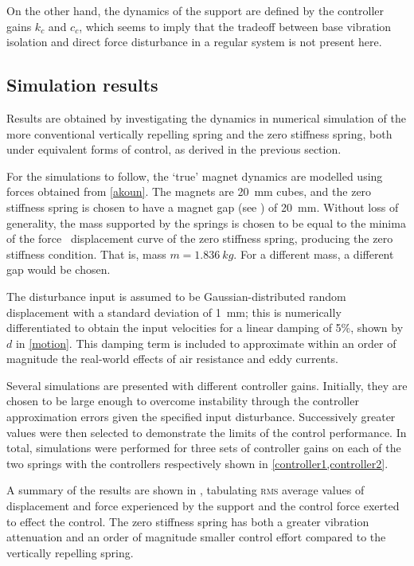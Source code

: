 On the other hand, the dynamics of the support are defined by the
controller gains $k_c$ and $c_c$, which seems to imply that the
tradeoff between base vibration isolation and direct force
disturbance in a regular system is not present here.

\subsection{Simulation results}

Results are obtained by investigating the dynamics in numerical
simulation of the more conventional vertically repelling spring and
the zero stiffness spring, both under equivalent forms of control,
as derived in the previous section.

For the simulations to follow, the `true' magnet dynamics are
modelled using forces obtained from \eqref{akoun}. The magnets are
\SI{20}{mm} cubes, and the zero stiffness spring is chosen to have a
magnet gap (see ) of \SI{20}{mm}. Without loss of
generality, the mass supported by the springs is chosen to be equal
to the minima of the force \vs\  displacement curve of the zero
stiffness spring, producing the zero stiffness condition. That is,
mass $m=\SI{1.836}{kg}$. For a different mass, a different gap
would be chosen.

The disturbance input is assumed to be Gaussian-distributed random
displacement with a standard deviation of \SI{1}{mm}; this is
numerically differentiated to obtain the input velocities for a
linear damping of 5\%, shown by $d$ in \eqref{motion}. This damping
term is included to approximate within an order of magnitude the
real-world effects of air resistance and eddy currents.

Several simulations are presented with different controller gains.
Initially, they are chosen to be large enough to overcome
instability through the controller approximation errors given the
specified input disturbance. Successively greater values were then
selected to demonstrate the limits of the control performance. In
total, simulations were performed for three sets of controller gains
on each of the two springs with the controllers respectively shown
in \eqref{controller1,controller2}.

A summary of the results are shown in , tabulating
\textsc{rms} average values of displacement and force experienced by
the support and the control force exerted to effect the control. The
zero stiffness spring has both a greater vibration attenuation and
an order of magnitude smaller control effort compared to the
vertically repelling spring.

